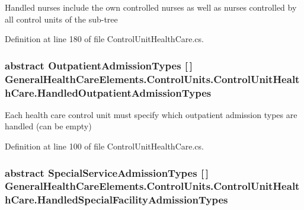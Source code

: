 Handled nurses include the own controlled nurses as well as nurses controlled by all control units of the sub-\/tree 



Definition at line 180 of file Control\+Unit\+Health\+Care.\+cs.

\subsubsection[{\texorpdfstring{Handled\+Outpatient\+Admission\+Types}{HandledOutpatientAdmissionTypes}}]{\setlength{\rightskip}{0pt plus 5cm}abstract {\bf Outpatient\+Admission\+Types} \mbox{[}$\,$\mbox{]} General\+Health\+Care\+Elements.\+Control\+Units.\+Control\+Unit\+Health\+Care.\+Handled\+Outpatient\+Admission\+Types\hspace{0.3cm}{\ttfamily [get]}}\hypertarget{class_general_health_care_elements_1_1_control_units_1_1_control_unit_health_care_a0dfb9af132c58819511381ccc739ffbd}{}\label{class_general_health_care_elements_1_1_control_units_1_1_control_unit_health_care_a0dfb9af132c58819511381ccc739ffbd}


Each health care control unit must specify which outpatient admission types are handled (can be empty) 



Definition at line 100 of file Control\+Unit\+Health\+Care.\+cs.

\subsubsection[{\texorpdfstring{Handled\+Special\+Facility\+Admission\+Types}{HandledSpecialFacilityAdmissionTypes}}]{\setlength{\rightskip}{0pt plus 5cm}abstract {\bf Special\+Service\+Admission\+Types} \mbox{[}$\,$\mbox{]} General\+Health\+Care\+Elements.\+Control\+Units.\+Control\+Unit\+Health\+Care.\+Handled\+Special\+Facility\+Admission\+Types\hspace{0.3cm}{\ttfamily [get]}}\hypertarget{class_general_health_care_elements_1_1_control_units_1_1_control_unit_health_care_ac70972f7088a6e74c5e9e402036f44f6}{}\label{class_general_health_care_elements_1_1_control_units_1_1_control_unit_health_care_ac70972f7088a6e74c5e9e402036f44f6}


